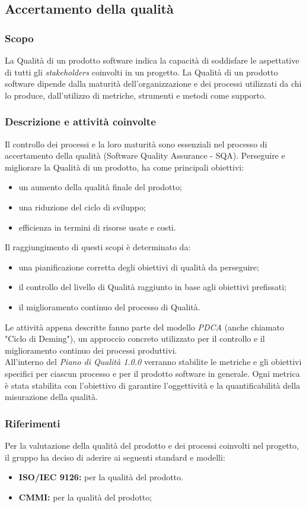 \subsection{Accertamento della qualit\` a}
\subsubsection{Scopo}
La Qualità di un prodotto software indica la capacità di soddisfare le aspettative di tutti gli \textit{stakeholders\glo} coinvolti in un progetto.
La Qualità di un prodotto software dipende dalla maturità dell'organizzazione e dei processi utilizzati da chi lo produce, dall'utilizzo di metriche, strumenti e metodi come supporto.


\subsubsection{Descrizione e attività coinvolte}
Il controllo dei processi e la loro maturità sono essenziali nel processo di accertamento della qualità (Software Quality Assurance - SQA). 
Perseguire e migliorare la Qualità di un prodotto, ha come principali obiettivi:
\begin{itemize}
	\item un aumento della qualità finale del prodotto;
	\item una riduzione del ciclo di sviluppo;
	\item efficienza in termini di risorse usate e costi.
\end{itemize}
Il raggiungimento di questi scopi è determinato da:
\begin{itemize}
	\item una pianificazione corretta degli obiettivi di qualità da perseguire;
	\item il controllo del livello di Qualità raggiunto in base agli obiettivi prefissati;
	\item il miglioramento continuo del processo di Qualità.
\end{itemize}
Le attività appena descritte fanno parte del modello \textit{PDCA\glo} (anche chiamato "Ciclo di Deming"), un approccio concreto utilizzato per il controllo e il miglioramento continuo dei processi produttivi.\\
All'interno del \textit{Piano di Qualità 1.0.0\doc} verranno stabilite le metriche e gli obiettivi specifici per ciascun processo e per il prodotto software in generale. Ogni metrica è stata stabilita con l'obiettivo di garantire l'oggettività e la quantificabilità della misurazione della qualità.

\subsubsection{Riferimenti}
Per la valutazione della qualità del prodotto e dei processi coinvolti nel progetto, il gruppo ha deciso di aderire ai seguenti standard e modelli:
\begin{itemize}
	\item \textbf{ISO/IEC 9126:} per la qualità del prodotto.
	\item \textbf{CMMI:} per la qualità del prodotto;
\end{itemize}
